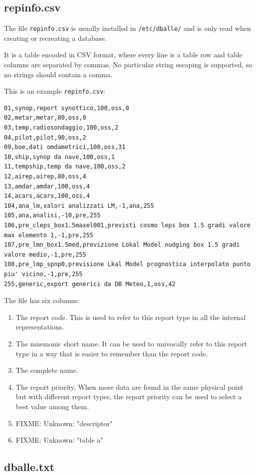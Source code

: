 \subsection{repinfo.csv}

The file {\tt repinfo.csv} is usually installed in {\tt /etc/dballe/} and is
only read when creating or recreating a database.

It is a table encoded in CSV format, where every line is a table row and table
columns are separated by commas.  No particular string escaping is supported,
so no strings should contain a comma.

This is an example {\tt repinfo.csv}:

\begin{verbatim}
01,synop,report synottico,100,oss,0
02,metar,metar,80,oss,0
03,temp,radiosondaggio,100,oss,2
04,pilot,pilot,90,oss,2
09,boe,dati omdametrici,100,oss,31
10,ship,synop da nave,100,oss,1
11,tempship,temp da nave,100,oss,2
12,airep,airep,80,oss,4
13,amdar,amdar,100,oss,4
14,acars,acars,100,oss,4
104,ana_lm,valori analizzati LM,-1,ana,255
105,ana,analisi,-10,pre,255
106,pre_cleps_box1.5maxel001,previsti cosmo leps box 1.5 gradi valore max elemento 1,-1,pre,255
107,pre_lmn_box1.5med,previzione Lokal Model nudging box 1.5 gradi valore medio,-1,pre,255
108,pre_lmp_spnp0,previsione Lkal Model prognostica interpolato punto piu' vicino,-1,pre,255
255,generic,export generici da DB Meteo,1,oss,42
\end{verbatim}

The file has six columns:

\begin{enumerate}
\item The report code.  This is used to refer to this report type in all the
      internal representations.
\item The mnemonic short name.  It can be used to univocally refer to this report
      type in a way that is easier to remember than the report code.
\item The complete name.
\item The report priority.  When more data are found in the same physical point
      but with different report types, the report priority can be used to
      select a best value among them.
\item FIXME: Unknown: "descriptor"
\item FIXME: Unknown: "table a"
\end{enumerate}
  
\subsection{dballe.txt}

